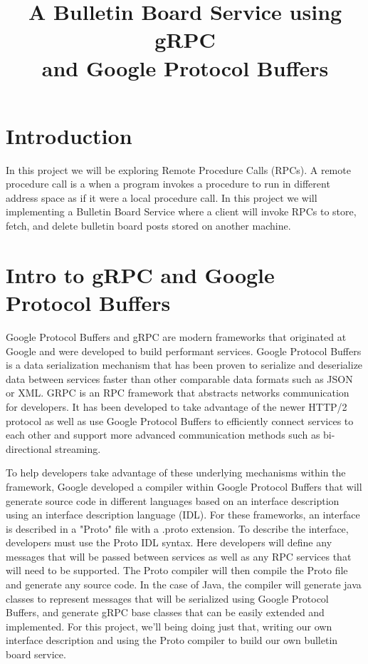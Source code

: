 \documentclass{article}
\title{A Bulletin Board Service using gRPC\\ and Google Protocol Buffers} %
\date{}%
\begin{document}
\maketitle %


\section*{Introduction} %

In this project we will be exploring Remote Procedure Calls (RPCs). A remote procedure call is a when a program invokes a procedure to run in different address space as if it were a local procedure call. In this project we will implementing a Bulletin Board Service where a client will invoke RPCs to store, fetch, and delete bulletin board posts stored on another machine.


\section{Intro to gRPC and Google Protocol Buffers} %

Google Protocol Buffers and gRPC are modern frameworks that originated at Google and were developed to build performant services. Google Protocol Buffers is a data serialization mechanism that has been proven to serialize and deserialize data between services faster than other comparable data formats such as JSON or XML. GRPC is an RPC framework that abstracts networks communication for developers. It has been developed to take advantage of the newer HTTP/2 protocol as well as use Google Protocol Buffers to efficiently connect services to each other and support more advanced communication methods such as bi-directional streaming. 

To help developers take advantage of these underlying mechanisms within the framework, Google developed a compiler within Google Protocol Buffers that will generate source code in different languages based on an interface description using an interface description language (IDL). For these frameworks, an interface is described in a "Proto" file with a .proto extension. To describe the interface, developers must use the Proto IDL syntax. Here developers will  define any messages that will be passed between services as well as any RPC services that will need to be supported. The Proto compiler will then compile the Proto file and generate any source code. In the case of Java, the compiler will generate java classes to represent messages that will be serialized using Google Protocol Buffers, and generate gRPC base classes that can be easily extended and implemented. 
For this project, we'll being doing just that, writing our own interface description and using the Proto compiler to build our own bulletin board service. 
\end{document}
